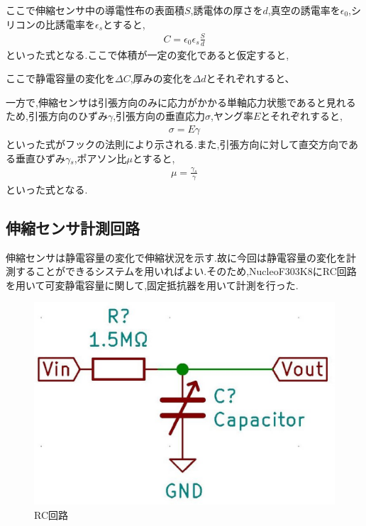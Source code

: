 ここで伸縮センサ中の導電性布の表面積$S$,誘電体の厚さを$d$,真空の誘電率を$\epsilon{}_0$,シリコンの比誘電率を$\epsilon{}_s$とすると,
\begin{eqnarray}
    C=\epsilon{}_0\epsilon{}_s\frac{S}{d}
\end{eqnarray}
といった式となる.ここで体積が一定の変化であると仮定すると, 

ここで静電容量の変化を$\Delta{}C$,厚みの変化を$\Delta{}d$とそれぞれすると、

一方で,伸縮センサは引張方向のみに応力がかかる単軸応力状態であると見れるため,引張方向のひずみ$\gamma$,引張方向の垂直応力$\sigma$,ヤング率$E$とそれぞれすると,
\begin{eqnarray}
    \sigma=E\gamma
    \label{フックの法則}
\end{eqnarray}
といった式がフックの法則により示される.また,引張方向に対して直交方向である垂直ひずみ$\gamma{}_s$,ポアソン比$\mu$とすると,
\begin{eqnarray}
    \mu = \frac{\gamma{}_s}{\gamma}
    \label{ポアソン比}
\end{eqnarray}
といった式となる.

\subsection{伸縮センサ計測回路}
伸縮センサは静電容量の変化で伸縮状況を示す.故に今回は静電容量の変化を計測することができるシステムを用いればよい.そのため,NucleoF303K8にRC回路を用いて可変静電容量に関して,固定抵抗器を用いて計測を行った.

\begin{figure}[h]
 \begin{center}
  \includegraphics[width=0.75\columnwidth,clip]{Photo/BackGround/RC.eps}
  \caption{RC回路}
  \label{RC}
 \end{center}
\end{figure}

